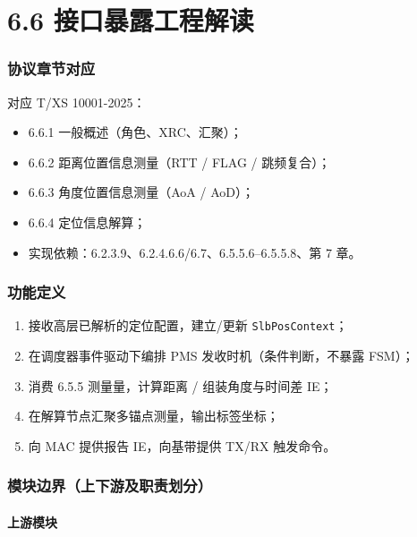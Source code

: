 \documentclass[11pt,a4paper]{ctexart}
\begin{document}
\newpage
\part{6.6 接口暴露工程解读}

\section{协议章节对应}

对应 T/XS 10001-2025：
\begin{itemize}[nosep]
  \item 6.6.1 一般概述（角色、XRC、汇聚）；
  \item 6.6.2 距离位置信息测量（RTT / FLAG / 跳频复合）；
  \item 6.6.3 角度位置信息测量（AoA / AoD）；
  \item 6.6.4 定位信息解算；
  \item 实现依赖：6.2.3.9、6.2.4.6.6/6.7、6.5.5.6--6.5.5.8、第 7 章。
\end{itemize}

\section{功能定义}

\begin{enumerate}[nosep]
  \item 接收高层已解析的定位配置，建立/更新 \texttt{SlbPosContext}；
  \item 在调度器事件驱动下编排 PMS 发收时机（条件判断，不暴露 FSM）；
  \item 消费 6.5.5 测量量，计算距离 / 组装角度与时间差 IE；
  \item 在解算节点汇聚多锚点测量，输出标签坐标；
  \item 向 MAC 提供报告 IE，向基带提供 TX/RX 触发命令。
\end{enumerate}

\section{模块边界（上下游及职责划分）}

\subsection{上游模块}
\end{document}
